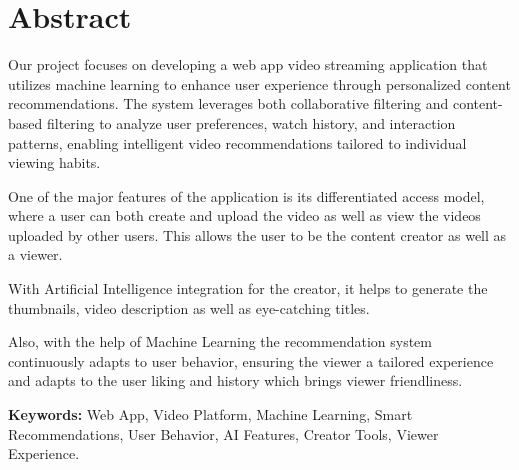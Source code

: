 \chapter*{Abstract}

Our project focuses on developing a web app video streaming application that utilizes machine learning to enhance user experience through personalized content recommendations. The system leverages both collaborative filtering and content-based filtering to analyze user preferences, watch history, and interaction patterns, enabling intelligent video recommendations tailored to individual viewing habits.

One of the major features of the application is its differentiated access model, where a user can both create and upload the video as well as view the videos uploaded by other users. This allows the user to be the content creator as well as a viewer.

With Artificial Intelligence integration for the creator, it helps to generate the thumbnails, video description as well as eye-catching titles.

Also, with the help of Machine Learning the recommendation system continuously adapts to user behavior, ensuring the viewer a tailored experience and adapts to the user liking and history which brings viewer friendliness.

\textbf{Keywords:} Web App, Video Platform, Machine Learning, Smart Recommendations, User Behavior, AI Features, Creator Tools, Viewer Experience.
